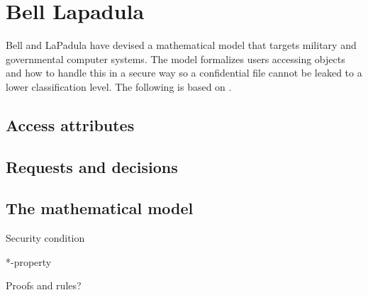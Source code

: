 \section{Bell Lapadula}

Bell and LaPadula have devised a mathematical model that targets military and governmental computer systems.
The model formalizes users accessing objects and how to handle this in a secure way so a confidential file cannot be leaked to a lower classification level.
The following is based on \citet{lapadula1996secure}.

\subsection{Access attributes}

\subsection{Requests and decisions}

\subsection{The mathematical model}

Security condition

*-property

Proofs and rules?

